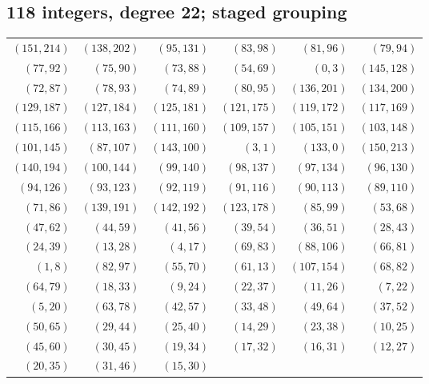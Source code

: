\subsection*{118 integers, degree 22; staged grouping}
\begingroup\small
\begin{longtable}{rrrrrr}
$(151,214)$ & $(138,202)$ & $(95,131)$ & $(83,98)$ & $(81,96)$ & $(79,94)$\\
$(77,92)$ & $(75,90)$ & $(73,88)$ & $(54,69)$ & $(0,3)$ & $(145,128)$\\
$(72,87)$ & $(78,93)$ & $(74,89)$ & $(80,95)$ & $(136,201)$ & $(134,200)$\\
$(129,187)$ & $(127,184)$ & $(125,181)$ & $(121,175)$ & $(119,172)$ & $(117,169)$\\
$(115,166)$ & $(113,163)$ & $(111,160)$ & $(109,157)$ & $(105,151)$ & $(103,148)$\\
$(101,145)$ & $(87,107)$ & $(143,100)$ & $(3,1)$ & $(133,0)$ & $(150,213)$\\
$(140,194)$ & $(100,144)$ & $(99,140)$ & $(98,137)$ & $(97,134)$ & $(96,130)$\\
$(94,126)$ & $(93,123)$ & $(92,119)$ & $(91,116)$ & $(90,113)$ & $(89,110)$\\
$(71,86)$ & $(139,191)$ & $(142,192)$ & $(123,178)$ & $(85,99)$ & $(53,68)$\\
$(47,62)$ & $(44,59)$ & $(41,56)$ & $(39,54)$ & $(36,51)$ & $(28,43)$\\
$(24,39)$ & $(13,28)$ & $(4,17)$ & $(69,83)$ & $(88,106)$ & $(66,81)$\\
$(1,8)$ & $(82,97)$ & $(55,70)$ & $(61,13)$ & $(107,154)$ & $(68,82)$\\
$(64,79)$ & $(18,33)$ & $(9,24)$ & $(22,37)$ & $(11,26)$ & $(7,22)$\\
$(5,20)$ & $(63,78)$ & $(42,57)$ & $(33,48)$ & $(49,64)$ & $(37,52)$\\
$(50,65)$ & $(29,44)$ & $(25,40)$ & $(14,29)$ & $(23,38)$ & $(10,25)$\\
$(45,60)$ & $(30,45)$ & $(19,34)$ & $(17,32)$ & $(16,31)$ & $(12,27)$\\
$(20,35)$ & $(31,46)$ & $(15,30)$ & & &\\
\end{longtable}
\endgroup

